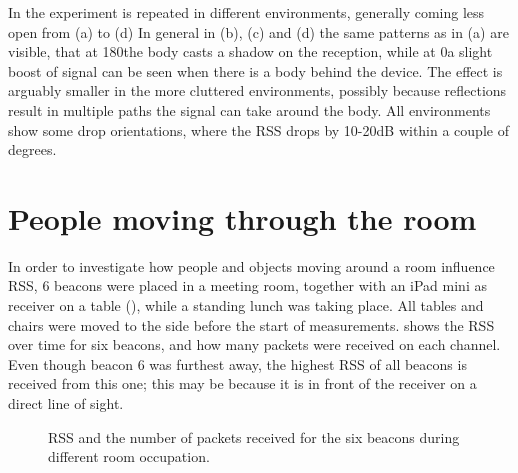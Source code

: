 In  the experiment is repeated in different environments, generally coming less open from (a) to (d)
In general in (b), (c) and (d) the same patterns as in (a) are visible, that at 180\tdegree the body casts a shadow on the reception, while at 0\tdegree a slight boost of signal can be seen when there is a body behind the device.
The effect is arguably smaller in the more cluttered environments, possibly because reflections result in multiple paths the signal can take around the body.
All environments show some drop orientations, where the RSS drops by 10-20dB within a couple of degrees.

\section{People moving through the room}
\label{sec:rss-busyroom}

In order to investigate how people and objects moving around a room influence RSS, 6 beacons were placed in a meeting room, together with an iPad mini as receiver on a table (), while a standing lunch was taking place.
All tables and chairs were moved to the side before the start of measurements.
 shows the RSS over time for six beacons, and how many packets were received on each channel.
Even though beacon 6 was furthest away, the highest RSS of all beacons is received from this one; this may be because it is in front of the receiver on a direct line of sight.

\begin{figure}[p]
    \begin{subfigure}[b]{0.5\textwidth}
    \end{subfigure}
    \begin{subfigure}[b]{0.5\textwidth}
    \end{subfigure}
    \begin{subfigure}[b]{0.5\textwidth}
    \end{subfigure}
    \begin{subfigure}[b]{0.5\textwidth}
    \end{subfigure}
    \begin{subfigure}[b]{0.5\textwidth}
    \end{subfigure}
    \begin{subfigure}[b]{0.5\textwidth}
    \end{subfigure}
    \caption{RSS and the number of packets received for the six beacons during different room occupation.}
    \label{fig:rss-busyroom}
\end{figure}

